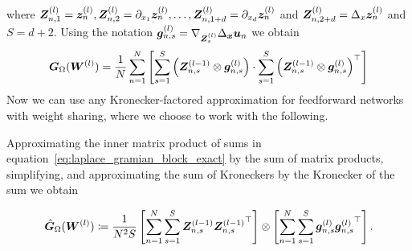 where ${\bm{Z}}_{n, 1}^{(l)} = {\bm{z}}_n^{(l)}, {\bm{Z}}_{n, 2}^{(l)} = \partial_{x_1}{\bm{z}}_n^{(l)}, \dots, {\bm{Z}}_{n, 1+d}^{(l)} = \partial_{x_d}{\bm{z}}_n^{(l)}$ and ${\bm{Z}}_{n, 2+d}^{(l)} = \Delta_x{\bm{z}}_n^{(l)}$ and $S=d+2$.
Using the notation
${\bm{g}}_{n, s}^{(l)} = \nabla_{{\bm{Z}}_{s}^{(l)}} \Delta_{\bm{x}}{\bm{u}}_n$ we obtain
\begin{equation}\label{eq:laplace_gramian_block_exact}
    {\bm{G}}_\Omega({\bm{W}}^{(l)})
    =
    \frac1N\sum_{n=1}^N
    \left[\sum_{s=1}^S \left( {\bm{Z}}^{(l-1)}_{n,s}\otimes {\bm{g}}_{n,s}^{(l)} \right)
    \cdot
    \sum_{s=1}^S \left( {\bm{Z}}
    ^{(l-1)}_{n,s}\otimes {\bm{g}}_{n,s}^{(l)} \right)^\top\right]
\end{equation}
Now we can use any Kronecker-factored approximation for feedforward networks with weight sharing, where we choose to work with the following.

%


Approximating the inner matrix product of sums in equation~\eqref{eq:laplace_gramian_block_exact} by the sum of matrix products, simplifying, and approximating the sum of Kroneckers by the Kronecker of the sum we obtain 
\begin{tcolorbox}[colframe=kfac, title={KFAC for Gauß-Newton with the Laplace operator},bottom=0mm,top=0mm,middle=0mm]
\begin{align}\label{eq:KFAC-PINN}
    \hat{\mG}_\Omega%
    (\mW^{(l)})
    \coloneqq \frac{1}{N^2 S}
    \left[\sum_{n=1}^N \sum_{s=1}^S \mZ^{(l-1)}_{n,s}{\mZ^{(l-1)}_{n,s}}^\top \right]
    \otimes
    \left[\sum_{n=1}^N\sum_{s=1}^S \vg^{(l)}_{n,s}{\vg^{(l)}_{n,s}}^\top   \right].
\end{align}
\end{tcolorbox}


